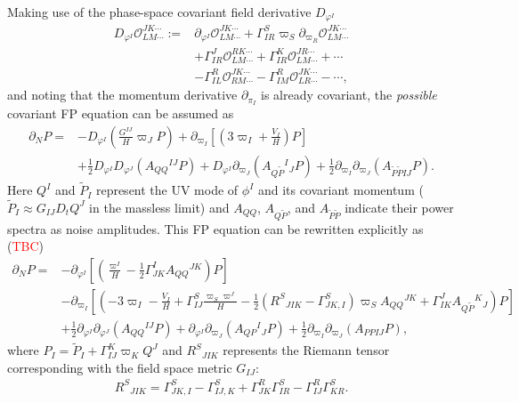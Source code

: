 \documentclass[aps, prd
, preprint
, nofootinbib 
, notitlepage
, longbibliography
]{revtex4-1}
\newcommand{\calO}{\mathcal{O}}
\newcommand{\bae}[1]{\begin{align} #1 \end{align}}
\newcommand{\Red}[1]{\textcolor{red}{\sffamily #1}}
\begin{document}
Making use of the phase-space covariant field derivative $D_{\varphi^I}$
\bae{
	D_{\varphi^I}\calO^{JK\cdots}_{LM\cdots}:=&\partial_{\varphi^I}\calO^{JK\cdots}_{LM\cdots}
	+\Gamma^S_{IR}\varpi_S\partial_{\varpi_R}\calO^{JK\cdots}_{LM\cdots} \nonumber \\
	&+\Gamma^J_{IR}\calO^{RK\cdots}_{LM\cdots}+\Gamma^K_{IR}\calO^{JR\cdots}_{LM\cdots}+\cdots \nonumber \\
	&-\Gamma^R_{IL}\calO^{JK\cdots}_{RM\cdots}-\Gamma^R_{IM}\calO^{JK\cdots}_{LR\cdots}-\cdots,
}
and noting that the momentum derivative $\partial_{\pi_I}$ is already covariant,
the \emph{possible} covariant FP equation can be assumed as
\bae{
	\partial_NP=&-D_{\varphi^I}\left(\frac{G^{IJ}}{H}\varpi_JP\right)+\partial_{\varpi_I}\left[\left(3\varpi_I+\frac{V_I}{H}\right)P\right] \nonumber \\
	&+\frac{1}{2}D_{\varphi^I}D_{\varphi^J}(A_{QQ}{}^{IJ}P)+D_{\varphi^I}\partial_{\varpi_J}(A_{Q\tilde{P}}{}^I{}_JP)
	+\frac{1}{2}\partial_{\varpi_I}\partial_{\varpi_J}(A_{\tilde{P}\tilde{P}IJ}P).
}
Here $Q^I$ and $\tilde{P}_I$ represent the UV mode of $\phi^I$ and its covariant momentum ($\tilde{P}_I\approx G_{IJ}D_tQ^J$ in the massless limit)
and $A_{QQ}$, $A_{Q\tilde{P}}$, and $A_{\tilde{P}\tilde{P}}$ indicate their power spectra as noise amplitudes.
This FP equation can be rewritten explicitly as (\Red{TBC})
\bae{
	\partial_NP=&-\partial_{\varphi^I}\left[\left(\frac{\varpi^I}{H}-\frac{1}{2}\Gamma^I_{JK}A_{QQ}{}^{JK}\right)P\right] \nonumber \\
	&-\partial_{\varpi_I}\left[\left(-3\varpi_I-\frac{V_I}{H}+\Gamma^S_{IJ}\frac{\varpi_S\varpi^J}{H}
	-\frac{1}{2}\left(R^S{}_{JIK}-\Gamma^S_{JK,I}\right)\varpi_SA_{QQ}{}^{JK}+\Gamma^J_{IK}A_{Q\tilde{P}}{}^K{}_J\right)P\right] \nonumber \\
	&+\frac{1}{2}\partial_{\varphi^I}\partial_{\varphi^J}(A_{QQ}{}^{IJ}P)+\partial_{\varphi^I}\partial_{\varpi_J}(A_{QP}{}^I{}_JP)
	+\frac{1}{2}\partial_{\varpi_I}\partial_{\varpi_J}(A_{PPIJ}P),
}
where $P_I=\tilde{P}_I+\Gamma_{IJ}^K\varpi_KQ^J$ and $R^S{}_{JIK}$ represents the Riemann tensor
corresponding with the field space metric $G_{IJ}$:
\bae{
    R^S{}_{JIK}=\Gamma^S_{JK,I}-\Gamma^S_{IJ,K}
    +\Gamma^R_{JK}\Gamma^S_{IR}-\Gamma^R_{IJ}\Gamma^S_{KR}.
}
\end{document}
